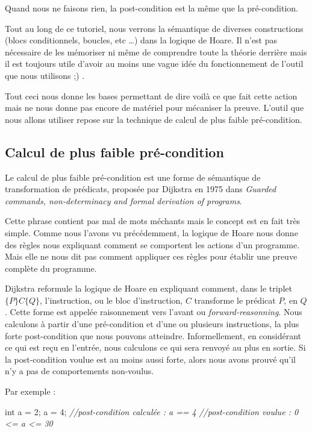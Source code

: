 \documentclass[12pt,francais,]{scrbook}
\newenvironment{Shaded}{}{}
\newcommand{\DataTypeTok}[1]{\textcolor[rgb]{0.56,0.13,0.00}{{#1}}}
\newcommand{\DecValTok}[1]{\textcolor[rgb]{0.25,0.63,0.44}{{#1}}}
\newcommand{\CommentTok}[1]{\textcolor[rgb]{0.38,0.63,0.69}{\textit{{#1}}}}
\newcommand{\NormalTok}[1]{{#1}}
\begin{document}
Quand nous ne faisons rien, la post-condition est la même que la
pré-condition.

Tout au long de ce tutoriel, nous verrons la sémantique de diverses
constructions (blocs conditionnels, boucles, etc \ldots{}) dans la
logique de Hoare. Il n'est pas nécessaire de les mémoriser ni même de
comprendre toute la théorie derrière mais il est toujours utile d'avoir
au moins une vague idée du fonctionnement de l'outil que nous utilisons
;) .

Tout ceci nous donne les bases permettant de dire \og{}voilà ce que fait
cette action\fg{} mais ne nous donne pas encore de matériel pour mécaniser
la preuve. L'outil que nous allons utiliser repose sur la technique de
calcul de plus faible pré-condition.

\subsection{Calcul de plus faible
pré-condition}\label{calcul-de-plus-faible-pruxe9-condition}

Le calcul de plus faible pré-condition est une forme de sémantique de
transformation de prédicats, proposée par Dijkstra en 1975 dans
\emph{Guarded commands, non-determinacy and formal derivation of
programs}.

Cette phrase contient pas mal de mots méchants mais le concept est en
fait très simple. Comme nous l'avons vu précédemment, la logique de
Hoare nous donne des règles nous expliquant comment se comportent les
actions d'un programme. Mais elle ne nous dit pas comment appliquer ces
règles pour établir une preuve complète du programme.

Dijkstra reformule la logique de Hoare en expliquant comment, dans le
triplet \(\{P\}C\{Q\}\), l'instruction, ou le bloc d'instruction, \(C\)
transforme le prédicat \(P\), en \(Q\). Cette forme est appelée
\og{}raisonnement vers l'avant\fg{} ou \emph{forward-reasonning}. Nous
calculons à partir d'une pré-condition et d'une ou plusieurs
instructions, la plus forte post-condition que nous pouvons atteindre.
Informellement, en considérant ce qui est reçu en l'entrée, nous
calculons ce qui sera renvoyé au plus en sortie. Si la post-condition
voulue est au moins aussi forte, alors nous avons prouvé qu'il n'y a pas
de comportements non-voulus.

Par exemple :

\begin{footnotesize}\begin{Shaded}
\begin{Highlighting}[]
\DataTypeTok{int} \NormalTok{a = }\DecValTok{2}\NormalTok{;}
\NormalTok{a = }\DecValTok{4}\NormalTok{;}
\CommentTok{//post-condition calculée : a == 4}
\CommentTok{//post-condition voulue   : 0 <= a <= 30}
\end{Highlighting}
\end{Shaded}\end{footnotesize}
\end{document}
